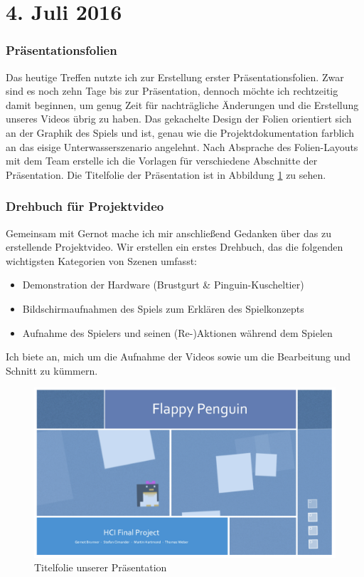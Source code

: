 \documentclass{report}
\begin{document}
\section*{4. Juli 2016}

\subsubsection*{Präsentationsfolien}

Das heutige Treffen nutzte ich zur Erstellung erster Präsentationsfolien. Zwar sind es noch zehn Tage bis zur Präsentation, dennoch möchte ich rechtzeitig damit beginnen, um genug Zeit für nachträgliche Änderungen und die Erstellung unseres Videos übrig zu haben. Das gekachelte Design der Folien orientiert sich an der Graphik des Spiels und ist, genau wie die Projektdokumentation farblich an das eisige Unterwasserszenario angelehnt. Nach Absprache des Folien-Layouts mit dem Team erstelle ich die Vorlagen für verschiedene Abschnitte der Präsentation. Die Titelfolie der Präsentation ist in Abbildung \ref{fig:presentation} zu sehen.


\subsubsection*{Drehbuch für Projektvideo}

Gemeinsam mit Gernot mache ich mir anschließend Gedanken über das zu erstellende Projektvideo. Wir erstellen ein erstes Drehbuch, das die folgenden wichtigsten Kategorien von Szenen umfasst:

\begin{itemize}
	\item Demonstration der Hardware (Brustgurt \& Pinguin-Kuscheltier)
	\item Bildschirmaufnahmen des Spiels zum Erklären des Spielkonzepts
	\item Aufnahme des Spielers und seinen (Re-)Aktionen während dem Spielen
\end{itemize} 

\noindent Ich biete an, mich um die Aufnahme der Videos sowie um die Bearbeitung und Schnitt zu kümmern.

\begin{figure}
	\includegraphics[width=120mm]{img/presentation}
	\caption{Titelfolie unserer Präsentation}
	\label{fig:presentation}
\end{figure}
\pagebreak
\end{document}
